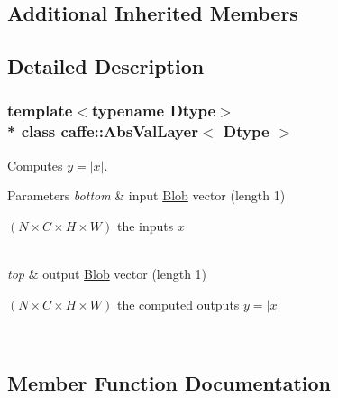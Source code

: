 \subsection*{Additional Inherited Members}


\subsection{Detailed Description}
\subsubsection*{template$<$typename Dtype$>$\\*
class caffe\+::\+Abs\+Val\+Layer$<$ Dtype $>$}

Computes $ y = |x| $. 


\begin{DoxyParams}{Parameters}
{\em bottom} & input \hyperlink{classcaffe_1_1Blob}{Blob} vector (length 1)
\begin{DoxyEnumerate}
\item $ (N \times C \times H \times W) $ the inputs $ x $ 
\end{DoxyEnumerate}\\
\hline
{\em top} & output \hyperlink{classcaffe_1_1Blob}{Blob} vector (length 1)
\begin{DoxyEnumerate}
\item $ (N \times C \times H \times W) $ the computed outputs $ y = |x| $ 
\end{DoxyEnumerate}\\
\hline
\end{DoxyParams}


\subsection{Member Function Documentation}
